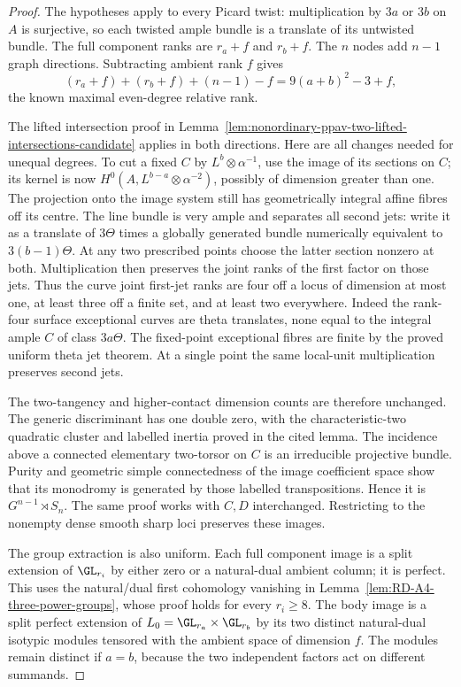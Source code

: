 \begin{proof}
The hypotheses apply to every Picard twist: multiplication
by $3a$ or $3b$ on $A$ is surjective, so each twisted ample
bundle is a translate of its untwisted bundle. The full
component ranks are $r_a+f$ and $r_b+f$. The $n$ nodes add
$n-1$ graph directions. Subtracting ambient rank $f$ gives
\[
 (r_a+f)+(r_b+f)+(n-1)-f=9(a+b)^2-3+f,
\]
the known maximal even-degree relative rank.

The lifted intersection proof in
Lemma~\ref{lem:nonordinary-ppav-two-lifted-intersections-candidate}
applies in both directions. Here are all changes needed for
unequal degrees. To cut a fixed $C$ by $L^b\otimes\alpha^{-1}$,
use the image of its sections on $C$; its kernel is now
$H^0(A,L^{b-a}\otimes\alpha^{-2})$, possibly of dimension
greater than one. The projection onto the image system still
has geometrically integral affine fibres off its centre.
The line bundle is very ample and separates all second jets:
write it as a translate of $3\Theta$ times a globally generated
bundle numerically equivalent to $3(b-1)\Theta$. At any two
prescribed points choose the latter section nonzero at both.
Multiplication then preserves the joint ranks of the first
factor on those jets. Thus the curve joint first-jet ranks
are four off a locus of dimension at most one, at least three
off a finite set, and at least two everywhere. Indeed the
rank-four surface exceptional curves are theta translates,
none equal to the integral ample $C$ of class $3a\Theta$.
The fixed-point exceptional fibres are finite by the proved
uniform theta jet theorem. At a single point the same local-unit
multiplication preserves second jets.

The two-tangency and higher-contact dimension counts are therefore
unchanged. The generic discriminant has one double zero, with
the characteristic-two quadratic cluster and labelled inertia
proved in the cited lemma. The incidence above a connected
elementary two-torsor on $C$ is an irreducible projective bundle.
Purity and geometric simple connectedness of the image coefficient
space show that its monodromy is generated by those labelled
transpositions. Hence it is $G^{n-1}\rtimes S_n$. The same proof
works with $C,D$ interchanged. Restricting to the nonempty dense
smooth sharp loci preserves these images.

The group extraction is also uniform. Each full component image
is a split extension of $\GL_{r_i}$ by either zero or a natural-dual
ambient column; it is perfect. This uses the natural/dual first
cohomology vanishing in
Lemma~\ref{lem:RD-A4-three-power-groups}, whose proof holds for
every $r_i\ge8$. The body image is a split perfect extension
of $L_0=\GL_{r_a}\times\GL_{r_b}$ by its two distinct natural-dual
isotypic modules tensored with the ambient space of dimension $f$.
The modules remain distinct if $a=b$, because the two independent
factors act on different summands.


\end{proof}
